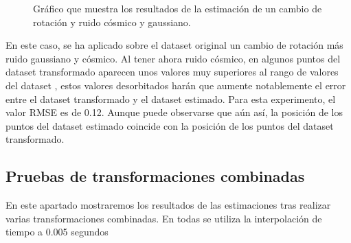 \begin{figure}[H]
\begin{center}
\hspace{0.5cm}

\end{center}

\caption{Gráfico que muestra los resultados de la estimación de un cambio de rotación y ruido cósmico y gaussiano.}
\end{figure}

En este caso, se ha aplicado sobre el dataset original un cambio de rotación más ruido gaussiano y cósmico. Al tener ahora ruido cósmico, en algunos puntos del dataset transformado aparecen unos valores muy superiores al rango de valores del dataset , estos valores desorbitados harán que aumente notablemente el error entre el dataset transformado y el dataset estimado. Para esta experimento, el valor RMSE es de 0.12. Aunque puede observarse que aún así, la posición de los puntos del dataset estimado coincide con la posición de los puntos del dataset transformado.




\subsection{Pruebas de transformaciones combinadas}

En este apartado mostraremos los resultados de las estimaciones tras realizar varias transformaciones combinadas. En todas se utiliza la interpolación de tiempo a 0.005 segundos


